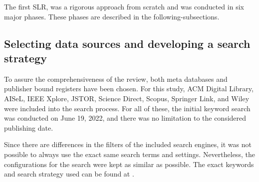 \documentclass[a4paper,11pt,article,oneside]{memoir}
\begin{document}
The first SLR, was a rigorous approach from scratch and was conducted in six major phases. These phases are described in the following-subsections.



\subsection{Selecting data sources and developing a search strategy}

To assure the comprehensiveness of the review, both meta databases and publisher bound registers have been chosen. For this study, ACM Digital Library, AISeL, IEEE Xplore, JSTOR, Science Direct, Scopus, Springer Link, and Wiley were included into the search process. For all of these, the initial keyword search was conducted on June 19, 2022, and there was no limitation to the considered publishing date.

Since there are differences in the filters of the included search engines, it was not possible to always use the exact same search terms and settings. Nevertheless, the configurations for the search were kept as similar as possible. The exact keywords and search strategy used can be found at \citet{SLRsearchTerms}. 


\end{document}
